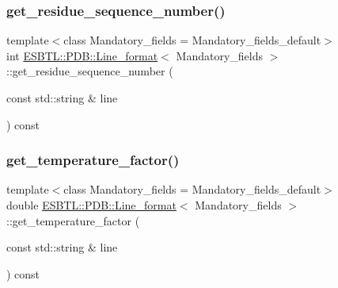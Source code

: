 \subsubsection{\texorpdfstring{get\+\_\+residue\+\_\+sequence\+\_\+number()}{get\_residue\_sequence\_number()}}
{\footnotesize\ttfamily template$<$class Mandatory\+\_\+fields  = Mandatory\+\_\+fields\+\_\+default$>$ \\
int \hyperlink{classESBTL_1_1PDB_1_1Line__format}{E\+S\+B\+T\+L\+::\+P\+D\+B\+::\+Line\+\_\+format}$<$ Mandatory\+\_\+fields $>$\+::get\+\_\+residue\+\_\+sequence\+\_\+number (\begin{DoxyParamCaption}\item[{const std\+::string \&}]{line }\end{DoxyParamCaption}) const\hspace{0.3cm}{\ttfamily [inline]}}

\mbox{\label{classESBTL_1_1PDB_1_1Line__format_afb1db7866fc6f7cc603ed5a9836100ad}} 
\subsubsection{\texorpdfstring{get\+\_\+temperature\+\_\+factor()}{get\_temperature\_factor()}}
{\footnotesize\ttfamily template$<$class Mandatory\+\_\+fields  = Mandatory\+\_\+fields\+\_\+default$>$ \\
double \hyperlink{classESBTL_1_1PDB_1_1Line__format}{E\+S\+B\+T\+L\+::\+P\+D\+B\+::\+Line\+\_\+format}$<$ Mandatory\+\_\+fields $>$\+::get\+\_\+temperature\+\_\+factor (\begin{DoxyParamCaption}\item[{const std\+::string \&}]{line }\end{DoxyParamCaption}) const\hspace{0.3cm}{\ttfamily [inline]}}

\mbox{\label{classESBTL_1_1PDB_1_1Line__format_afe06d4e9bcb00c28d4c4a7ba975d6f0b}} 
